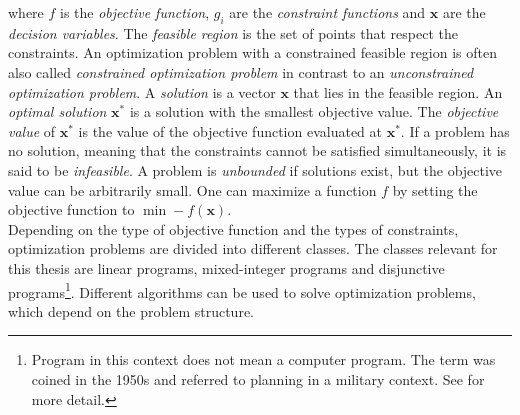  where $f$ is the \textit{objective function}, $g_i$ are the \textit{constraint functions} and $\mathbf x$ are the \textit{decision variables}. %
The \textit{feasible region} is the set of points that respect the constraints. An optimization problem with a constrained feasible region is often also called \textit{constrained optimization problem} in contrast to an \textit{unconstrained optimization problem}. A \textit{solution} is a vector $\mathbf x$ that lies in the feasible region. An \textit{optimal solution} $\mathbf x^*$ is a solution with the smallest objective value. The \textit{objective value} of $\mathbf x^*$ is the value of the objective function evaluated at $\mathbf x^*$. If a problem has no solution, meaning that the constraints cannot be satisfied simultaneously, it is said to be \textit{infeasible}. A problem is \textit{unbounded} if solutions exist, but the objective value can be arbitrarily small. \vspace*{-\baselineskip}\newpage
One can maximize a function $f$ by setting the objective function to $\min -f(\mathbf x)$.\\
Depending on the type of objective function and the types of constraints, optimization problems are divided into different classes. The classes relevant for this thesis are linear programs, mixed-integer programs and disjunctive programs\footnote[1]{Program in this context does not mean a computer program. The term was coined in the 1950s and referred to planning in a military context. See \cite{understanding_lp} for more detail.}. 
Different algorithms can be used to solve optimization problems, which depend on the problem structure.

